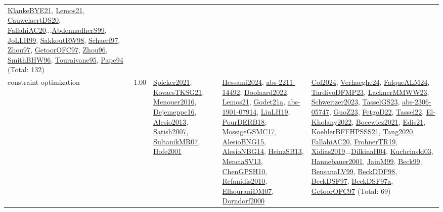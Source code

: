 {\begin{longtable}{p{3cm}r>{\raggedright\arraybackslash}p{6cm}>{\raggedright\arraybackslash}p{6cm}>{\raggedright\arraybackslash}p{8cm}}
\hyperref[detail:KlankeBYE21]{KlankeBYE21}, \hyperref[detail:Lemos21]{Lemos21}, \hyperref[detail:CauwelaertDS20]{CauwelaertDS20}, \hyperref[detail:FallahiAC20]{FallahiAC20}...\hyperref[detail:AbdennadherS99]{AbdennadherS99}, \hyperref[detail:JoLLH99]{JoLLH99}, \hyperref[detail:SakkoutRW98]{SakkoutRW98}, \hyperref[detail:Schaerf97]{Schaerf97}, \hyperref[detail:Zhou97]{Zhou97}, \hyperref[detail:GetoorOFC97]{GetoorOFC97}, \hyperref[detail:Zhou96]{Zhou96}, \hyperref[detail:SmithBHW96]{SmithBHW96}, \hyperref[detail:Touraivane95]{Touraivane95}, \hyperref[detail:Pape94]{Pape94} (Total: 132)\\
\index{constraint optimization}\index{CP!constraint optimization}constraint optimization &  1.00 & \hyperref[detail:Spieker2021]{Spieker2021}, \hyperref[detail:KovacsTKSG21]{KovacsTKSG21}, \hyperref[detail:Menouer2016]{Menouer2016}, \hyperref[detail:Dejemeppe16]{Dejemeppe16}, \hyperref[detail:Alesio2013]{Alesio2013}, \hyperref[detail:Satish2007]{Satish2007}, \hyperref[detail:SultanikMR07]{SultanikMR07}, \hyperref[detail:Hofe2001]{Hofe2001} & \hyperref[detail:Hessami2024]{Hessami2024}, \hyperref[detail:abs-2211-14492]{abs-2211-14492}, \hyperref[detail:Doolaard2022]{Doolaard2022}, \hyperref[detail:Lemos21]{Lemos21}, \hyperref[detail:Godet21a]{Godet21a}, \hyperref[detail:abs-1901-07914]{abs-1901-07914}, \hyperref[detail:LiuLH19]{LiuLH19}, \hyperref[detail:PourDERB18]{PourDERB18}, \hyperref[detail:MossigeGSMC17]{MossigeGSMC17}, \hyperref[detail:AlesioBNG15]{AlesioBNG15}, \hyperref[detail:AlesioNBG14]{AlesioNBG14}, \hyperref[detail:HeinzSB13]{HeinzSB13}, \hyperref[detail:MenciaSV13]{MenciaSV13}, \hyperref[detail:ChenGPSH10]{ChenGPSH10}, \hyperref[detail:Refanidis2010]{Refanidis2010}, \hyperref[detail:ElhouraniDM07]{ElhouraniDM07}, \hyperref[detail:Dorndorf2000]{Dorndorf2000} & \hyperref[detail:Col2024]{Col2024}, \hyperref[detail:Verhaeghe24]{Verhaeghe24}, \hyperref[detail:FalqueALM24]{FalqueALM24}, \hyperref[detail:TardivoDFMP23]{TardivoDFMP23}, \hyperref[detail:LacknerMMWW23]{LacknerMMWW23}, \hyperref[detail:Schweitzer2023]{Schweitzer2023}, \hyperref[detail:TasselGS23]{TasselGS23}, \hyperref[detail:abs-2306-05747]{abs-2306-05747}, \hyperref[detail:GuoZ23]{GuoZ23}, \hyperref[detail:FetgoD22]{FetgoD22}, \hyperref[detail:Tassel22]{Tassel22}, \hyperref[detail:El-Kholany2022]{El-Kholany2022}, \hyperref[detail:Bocewicz2021]{Bocewicz2021}, \hyperref[detail:Edis21]{Edis21}, \hyperref[detail:KoehlerBFFHPSSS21]{KoehlerBFFHPSSS21}, \hyperref[detail:Tang2020]{Tang2020}, \hyperref[detail:FallahiAC20]{FallahiAC20}, \hyperref[detail:FrohnerTR19]{FrohnerTR19}, \hyperref[detail:Xidias2019]{Xidias2019}...\hyperref[detail:DilkinaH04]{DilkinaH04}, \hyperref[detail:Kuchcinski03]{Kuchcinski03}, \hyperref[detail:Hannebauer2001]{Hannebauer2001}, \hyperref[detail:JainM99]{JainM99}, \hyperref[detail:Beck99]{Beck99}, \hyperref[detail:BensanaLV99]{BensanaLV99}, \hyperref[detail:BeckDDF98]{BeckDDF98}, \hyperref[detail:BeckDSF97]{BeckDSF97}, \hyperref[detail:BeckDSF97a]{BeckDSF97a}, \hyperref[detail:GetoorOFC97]{GetoorOFC97} (Total: 69)\\

\end{longtable}}
